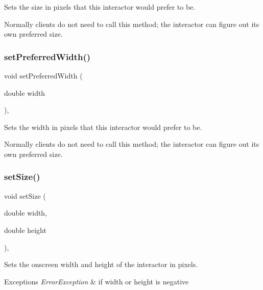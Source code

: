 Sets the size in pixels that this interactor would prefer to be. 

Normally clients do not need to call this method; the interactor can figure out its own preferred size. \mbox{\label{classsgl_1_1GInteractor_a3db429ab2fa52efd187eec0ed8cdd9f2}} 
\subsubsection{\texorpdfstring{set\+Preferred\+Width()}{setPreferredWidth()}}
{\footnotesize\ttfamily void set\+Preferred\+Width (\begin{DoxyParamCaption}\item[{double}]{width }\end{DoxyParamCaption})\hspace{0.3cm}{\ttfamily [virtual]}, {\ttfamily [inherited]}}



Sets the width in pixels that this interactor would prefer to be. 

Normally clients do not need to call this method; the interactor can figure out its own preferred size. \mbox{\label{classsgl_1_1GInteractor_aca25d49481f9bf5fc8f7df4c086c4ce7}} 
\subsubsection{\texorpdfstring{set\+Size()}{setSize()}\hspace{0.1cm}{\footnotesize\ttfamily [1/2]}}
{\footnotesize\ttfamily void set\+Size (\begin{DoxyParamCaption}\item[{double}]{width,  }\item[{double}]{height }\end{DoxyParamCaption})\hspace{0.3cm}{\ttfamily [virtual]}, {\ttfamily [inherited]}}



Sets the onscreen width and height of the interactor in pixels. 


\begin{DoxyExceptions}{Exceptions}
{\em Error\+Exception} & if width or height is negative \\
\hline
\end{DoxyExceptions}


